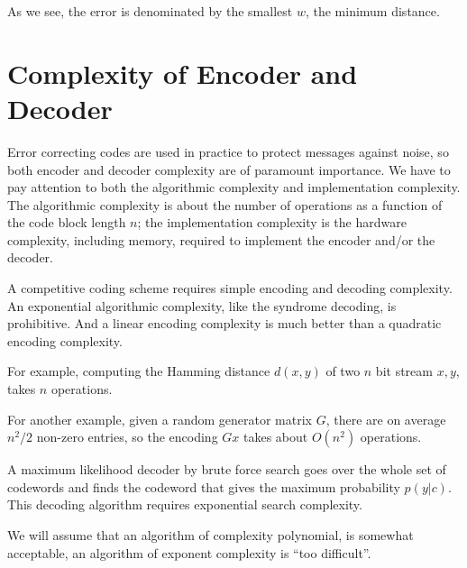 As we see, the error is denominated by the smallest \(w\), the minimum distance. 

\section{Complexity of Encoder and Decoder}
Error correcting codes are used in practice to protect messages against noise, so both encoder and decoder complexity are of paramount importance. We have to pay attention to both the algorithmic complexity and implementation complexity. The algorithmic complexity is about the number of operations as a function of the code block length \(n\); the implementation complexity is the hardware complexity, including memory, required to implement the encoder and/or the decoder. 

A competitive coding scheme requires simple encoding and decoding complexity. An exponential algorithmic complexity, like the syndrome decoding, is prohibitive. And a linear encoding complexity is much better than a quadratic encoding complexity.  


For example, computing the Hamming distance  \(d(x,y)\) of two \(n\) bit stream \(x, y\),  takes \(n\) operations.

For another example, given a random generator matrix \(G\), there are on average \(n^2/2\) non-zero entries, so the encoding \(Gx\) takes about \(O(n^2)\) operations. 

A maximum likelihood decoder by brute force search goes over the whole set of codewords  and finds the codeword that gives the maximum probability \(p(y|c)\). This decoding algorithm requires exponential search complexity. 


We will assume that an algorithm of complexity polynomial, is somewhat acceptable, an algorithm of exponent
complexity is “too difficult”.

